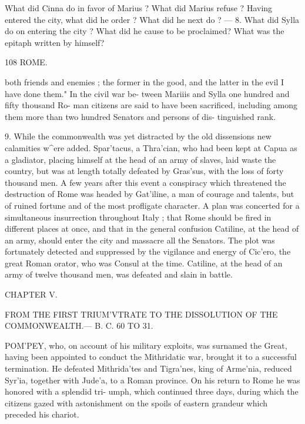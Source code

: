 \documentclass[openany,a4paper]{memoir}
\begin{document}
What did Cinna do in favor of Marius ? What did Marius refuse ? 
Having entered the city, what did he order ? What did he next do ? — 
8. What did Sylla do on entering the city ? What did he cause to be 
proclaimed? What was the epitaph written by himself? 



108 ROME. 

both friends and enemies ; the former in the good, and the 
latter in the evil I have done them." In the civil war be- 
tween Mariiis and Sylla one hundred and fifty thousand Ro- 
man citizens are said to have been sacrificed, including among 
them more than two hundred Senators and persons of dis- 
tinguished rank. 

9. While the commonwealth was yet distracted by the 
old dissensions new calamities w^ere added. Spar'tacus, a 
Thra'cian, who had been kept at Capua as a gladiator, 
placing himself at the head of an army of slaves, laid waste 
the country, but was at length totally defeated by Gras'sus, 
with the loss of forty thousand men. A few years after this 
event a conspiracy which threatened the destruction of Rome 
was headed by Gat'iline, a man of courage and talents, but of 
ruined fortune and of the most profligate character. A plan 
was concerted for a simultaneous insurrection throughout 
Italy ; that Rome should be fired in different places at once, 
and that in the general confusion Catiline, at the head of an 
army, should enter the city and massacre all the Senators. 
The plot was fortunately detected and suppressed by the 
vigilance and energy of Cic'ero, the great Roman orator, 
who was Consul at the time. Catiline, at the head of an 
army of twelve thousand men, was defeated and slain in battle. 



CHAPTER V. 



FROM THE FIRST TRIUM'VTRATE TO THE DISSOLUTION OF 
THE COMMONWEALTH.— B. C. 60 TO 31. 

POM'PEY, who, on account of his military exploits, was 
surnamed the Great, having been appointed to conduct 
the Mithridatic war, brought it to a successful termination. 
He defeated Mithrida'tes and Tigra'nes, king of Arme'nia, 
reduced Syr'ia, together with Jude'a, to a Roman province. 
On his return to Rome he was honored with a splendid tri- 
umph, which continued three days, during which the citizens 
gazed with astonishment on the spoils of eastern grandeur 
which preceded his chariot. 
\end{document}
